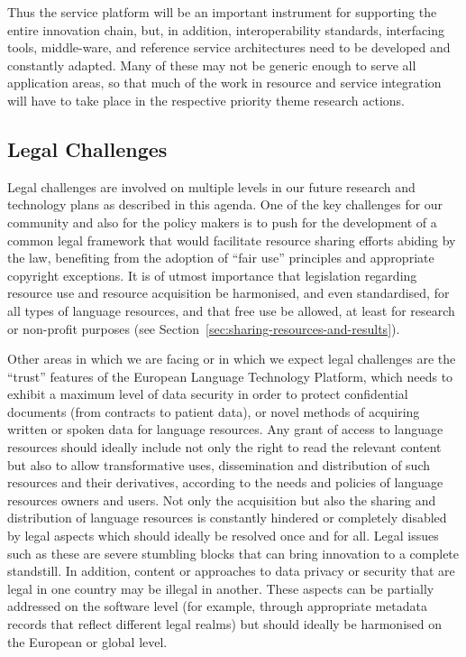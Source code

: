 \documentclass[10pt, plain]{../../metanetpaper}
\begin{document}
\begin{multicols}{2}
Thus the service platform will be an important instrument for supporting the entire innovation chain, but, in addition, interoperability standards, interfacing tools, middle-ware, and reference service architectures need to be developed and constantly adapted. Many of these may not be generic enough to serve all application areas, so that much of the work in resource and service integration will have to take place in the respective priority theme research actions.

\subsection{Legal Challenges}
\label{sec:legal-aspects}

Legal challenges are involved on multiple levels in our future research and technology plans as described in this agenda. One of the key challenges for our community and also for the policy makers is to push for the development of a common legal framework that would facilitate resource sharing efforts abiding by the law, benefiting from the adoption of “fair use” principles and appropriate copyright exceptions. It is of utmost importance that legislation regarding resource use and resource acquisition be harmonised, and even standardised, for all types of language resources, and that free use be allowed, at least for research or non-profit purposes (see Section~\ref{sec:sharing-resources-and-results}).

Other areas in which we are facing or in which we expect legal challenges are the ``trust'' features of the European Language Technology Platform, which needs to exhibit a maximum level of data security in order to protect confidential documents (from contracts to patient data), or novel methods of acquiring written or spoken data for language resources. Any grant of access to language resources should ideally include not only the right to read the relevant content but also to allow transformative uses, dissemination and distribution of such resources and their derivatives, according to the needs and policies of language resources owners and users. Not only the acquisition but also the sharing and distribution of language resources is constantly hindered or completely disabled by legal aspects which should ideally be resolved once and for all. Legal issues such as these are severe stumbling blocks that can bring innovation to a complete standstill. In addition, content or approaches to data privacy or security that are legal in one country may be illegal in another. These aspects can be partially addressed on the software level (for example, through appropriate metadata records that reflect different legal realms) but should ideally be harmonised on the European or global level.


\end{multicols}
\end{document}
